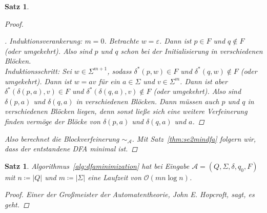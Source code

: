 \documentclass[11pt, a4paper]{article}
\theoremstyle{definition}
\theoremstyle{plain}
\newtheorem{theorem}[definition]{Satz}
\numberwithin{equation}{section}
\newenvironment{subproof}[1][\proofname]{\renewcommand{\qedsymbol}{$\blacksquare$}\vspace{-3ex}\begin{proof}[#1]}{\end{proof}\vspace{-3ex}}
\begin{document}
\begin{theorem}
\begin{proof}
\begin{enumerate}
\begin{subproof}
					Induktionsverankerung: $m = 0$. Betrachte $w = \varepsilon$. Dann ist $p \in F$ und $q \notin F$ (oder umgekehrt). Also sind $p$ und $q$ schon bei der Initialisierung in verschiedenen Blöcken.\checkmark\\
					Induktionsschritt: Sei $w \in \Sigma^{m+1}$, sodass $\delta^\ast(p, w) \in F$ und $\delta^\ast(q, w) \notin F$ (oder umgekehrt). Dann ist $w = av$ für ein $a \in \Sigma$ und $v \in \Sigma^m$. Dann ist aber $\delta^\ast(\delta(p, a), v) \in F$ und $\delta^\ast(\delta(q, a), v) \notin F$ (oder umgekehrt). Also sind $\delta(p, a)$ und $\delta(q, a)$ in verschiedenen Blöcken. Dann müssen auch $p$ und $q$ in verschiedenen Blöcken liegen, denn sonst ließe sich eine weitere Verfeinerung finden vermöge der Blöcke von $\delta(p, a)$ und $\delta(q, a)$ und $a$.
				\end{subproof}
		\end{enumerate}
		Also berechnet die Blockverfeinerung $\sim_\mathcal{A}$. Mit Satz~\ref{thm:se2mindfa} folgern wir, dass der entstandene DFA minimal ist.
	\end{proof}
\end{theorem}
\begin{theorem}
	Algorithmus~\ref{alg:dfaminimization} hat bei Eingabe $\mathcal{A} = (Q, \Sigma, \delta, q_0, F)$ mit $n \coloneqq |Q|$ und $m \coloneqq |\Sigma|$ eine Laufzeit von $\mathcal{O}(mn \log n)$.
	\begin{proof}
		Einer der Großmeister der Automatentheorie, John E. Hopcroft, sagt, es geht.
	\end{proof}
\end{theorem}
\end{document}
